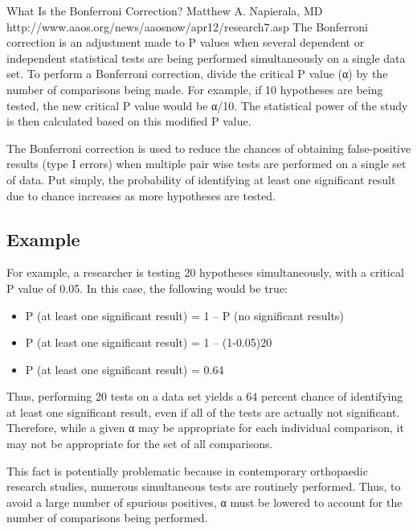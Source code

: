 What Is the Bonferroni Correction?
Matthew A. Napierala, MD
http://www.aaos.org/news/aaosnow/apr12/research7.asp
The Bonferroni correction is an adjustment made to P values when several dependent or independent statistical tests are being performed simultaneously on a single data set. To perform a Bonferroni correction, divide the critical P value (α) by the number of comparisons being made. For example, if 10 hypotheses are being tested, the new critical P value would be α/10. The statistical power of the study is then calculated based on this modified P value.

The Bonferroni correction is used to reduce the chances of obtaining false-positive results (type I errors) when multiple pair wise tests are performed on a single set of data. Put simply, the probability of identifying at least one significant result due to chance increases as more hypotheses are tested.
\subsection*{Example}
For example, a researcher is testing 20 hypotheses simultaneously, with a critical P value of 0.05. In this case, the following would be true:

\begin{itemize}
\item P (at least one significant result) = 1 – P (no significant results)
\item P (at least one significant result) = 1 – (1-0.05)20
\item P (at least one significant result) = 0.64
\end{itemize}
Thus, performing 20 tests on a data set yields a 64 percent chance of identifying at least one significant result, even if all of the tests are actually not significant. Therefore, while a given α may be appropriate for each individual comparison, it may not be appropriate for the set of all comparisons.

This fact is potentially problematic because in contemporary orthopaedic research studies, numerous simultaneous tests are routinely performed. Thus, to avoid a large number of spurious positives, α must be lowered to account for the number of comparisons being performed.

